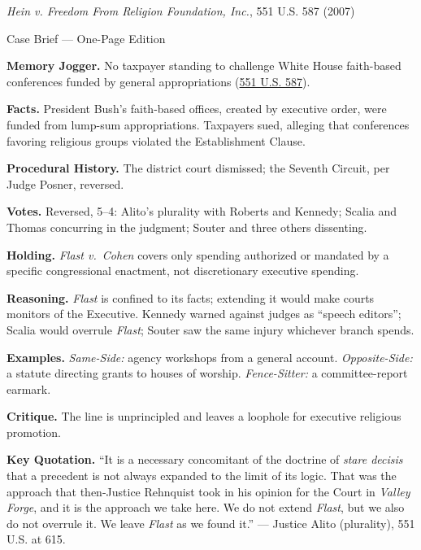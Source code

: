 \documentclass[12pt]{article}
\begin{document}
\begin{center}
{\Large \textit{Hein v. Freedom From Religion Foundation, Inc.}, 551 U.S. 587 (2007)\par}
\vspace{0.3em}
{\normalsize Case Brief --- One-Page Edition\par}
\end{center}

\textbf{Memory Jogger.} No taxpayer standing to challenge White House faith-based conferences funded by general appropriations (\href{https://supreme.justia.com/cases/federal/us/551/587/}{551 U.S. 587}).

\textbf{Facts.} President Bush's faith-based offices, created by executive order, were funded from lump-sum appropriations. Taxpayers sued, alleging that conferences favoring religious groups violated the Establishment Clause.

\textbf{Procedural History.} The district court dismissed; the Seventh Circuit, per Judge Posner, reversed.

\textbf{Votes.} Reversed, 5--4: Alito's plurality with Roberts and Kennedy; Scalia and Thomas concurring in the judgment; Souter and three others dissenting.

\textbf{Holding.} \textit{Flast v.\ Cohen} covers only spending authorized or mandated by a specific congressional enactment, not discretionary executive spending.

\textbf{Reasoning.} \textit{Flast} is confined to its facts; extending it would make courts monitors of the Executive. Kennedy warned against judges as ``speech editors''; Scalia would overrule \textit{Flast}; Souter saw the same injury whichever branch spends.

\textbf{Examples.} \emph{Same-Side:} agency workshops from a general account. \emph{Opposite-Side:} a statute directing grants to houses of worship. \emph{Fence-Sitter:} a committee-report earmark.

\textbf{Critique.} The line is unprincipled and leaves a loophole for executive religious promotion.

\textbf{Key Quotation.} ``It is a necessary concomitant of the doctrine of \textit{stare decisis} that a precedent is not always expanded to the limit of its logic. That was the approach that then-Justice Rehnquist took in his opinion for the Court in \textit{Valley Forge}, and it is the approach we take here. We do not extend \textit{Flast}, but we also do not overrule it. We leave \textit{Flast} as we found it.'' --- Justice Alito (plurality), 551 U.S. at 615.
\end{document}
